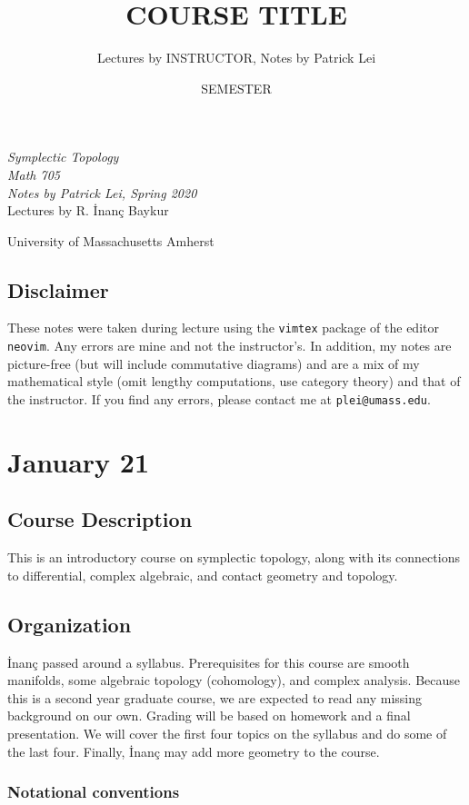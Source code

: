 \documentclass[leqno, openany]{memoir}
\title{COURSE TITLE}
\author{Lectures by INSTRUCTOR, Notes by Patrick Lei}
\date{SEMESTER}
\theoremstyle{definition}
\theoremstyle{remark}
\theoremstyle{plain}
\theoremstyle{definition}
\theoremstyle{remark}
\newcommand*{\titleSW}
    {\begingroup%
    \raggedleft
    \vspace*{\baselineskip}
    {\Huge\itshape Symplectic Topology \\ Math 705}\\[\baselineskip]
    {\large\itshape Notes by Patrick Lei,
                    Spring 2020}\\[0.2\textheight]
                    {\Large Lectures by R. \.Inan\c{c} Baykur}\par
    \vfill
    {\Large \sffamily University of Massachusetts Amherst}
    \vspace*{\baselineskip}
\endgroup}
\begin{document}
    
\begin{titlingpage}
\titleSW
\end{titlingpage}

\thispagestyle{empty}
\section*{Disclaimer}%
\label{sec:disclaimer}

These notes were taken during lecture using the \texttt{vimtex} package of the
editor \texttt{neovim}.  Any errors are mine and not the instructor's.  In
addition, my notes are picture-free (but will include commutative diagrams) and
are a mix of my mathematical style (omit lengthy computations, use category
theory) and that of the instructor.  If you find any errors, please contact me
at \texttt{plei@umass.edu}.  \newpage



\tableofcontents

\chapter{January 21}%

\section{Course Description}%

This is an introductory course on symplectic topology, along with its
connections to differential, complex algebraic, and contact geometry and
topology.

\section{Organization}%

\.Inan\c{c} passed around a syllabus. Prerequisites for this course are smooth
manifolds, some algebraic topology (cohomology), and complex analysis. Because
this is a second year graduate course, we are expected to read any missing
background on our own. Grading will be based on homework and a final
presentation. We will cover the first four topics on the syllabus and do some
of the last four. Finally, \.Inan\c{c} may add more geometry to the course.

\subsection{Notational conventions}%
\end{document}
